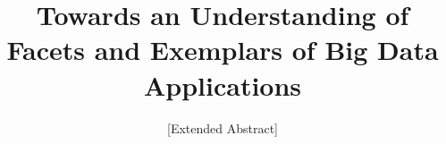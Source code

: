 \documentclass{acm_proc_article-sp}
\begin{document}
\title{Towards an Understanding of Facets and Exemplars of Big Data Applications}
\subtitle{[Extended Abstract]}
%
%
%
%
%
\end{document}
